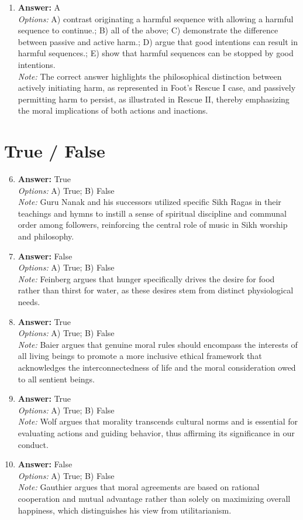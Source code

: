 \documentclass[12pt]{article}
\begin{document}
\begin{enumerate}[label=\arabic*.]
\item \textbf{Answer:} A
\\ \textit{Options:} A) contrast originating a harmful sequence with allowing a harmful sequence to continue.; B) all of the above; C) demonstrate the difference between passive and active harm.; D) argue that good intentions can result in harmful sequences.; E) show that harmful sequences can be stopped by good intentions.
\\ \textit{Note:} The correct answer highlights the philosophical distinction between actively initiating harm, as represented in Foot's Rescue I case, and passively permitting harm to persist, as illustrated in Rescue II, thereby emphasizing the moral implications of both actions and inactions.
\end{enumerate}

\section*{True / False}
\begin{enumerate}[label=\arabic*.]
\setcounter{enumi}{5}
\item \textbf{Answer:} True
\\ \textit{Options:} A) True; B) False
\\ \textit{Note:} Guru Nanak and his successors utilized specific Sikh Ragas in their teachings and hymns to instill a sense of spiritual discipline and communal order among followers, reinforcing the central role of music in Sikh worship and philosophy.
\item \textbf{Answer:} False
\\ \textit{Options:} A) True; B) False
\\ \textit{Note:} Feinberg argues that hunger specifically drives the desire for food rather than thirst for water, as these desires stem from distinct physiological needs.
\item \textbf{Answer:} True
\\ \textit{Options:} A) True; B) False
\\ \textit{Note:} Baier argues that genuine moral rules should encompass the interests of all living beings to promote a more inclusive ethical framework that acknowledges the interconnectedness of life and the moral consideration owed to all sentient beings.
\item \textbf{Answer:} True
\\ \textit{Options:} A) True; B) False
\\ \textit{Note:} Wolf argues that morality transcends cultural norms and is essential for evaluating actions and guiding behavior, thus affirming its significance in our conduct.
\item \textbf{Answer:} False
\\ \textit{Options:} A) True; B) False
\\ \textit{Note:} Gauthier argues that moral agreements are based on rational cooperation and mutual advantage rather than solely on maximizing overall happiness, which distinguishes his view from utilitarianism.
\end{enumerate}
\end{document}
